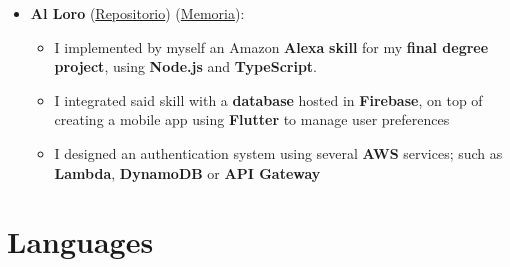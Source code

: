 \documentclass[letterpaper, 12pt, dvipsnames]{article}
\newcommand{\upv}{UPV}
\begin{document}
\begin{itemize}
    \item \textbf{Al Loro} (\href{https://github.com/algono/FeedTheParrot-RSS}{Repositorio}) (\href{http://hdl.handle.net/10251/174256}{Memoria}):
          \begin{itemize}
              \item I implemented by myself an Amazon \textbf{Alexa} \textbf{skill} for my \textbf{final degree project}, using \textbf{Node.js} and \textbf{TypeScript}.
              \item I integrated said skill with a \textbf{database} hosted in \textbf{Firebase}, on top of creating a mobile app using \textbf{Flutter} to manage user preferences
              \item I designed an authentication system using several \textbf{AWS} services; such as \textbf{Lambda}, \textbf{DynamoDB} or \textbf{API Gateway}
          \end{itemize}
\end{itemize}

\section*{Languages}
\end{document}
